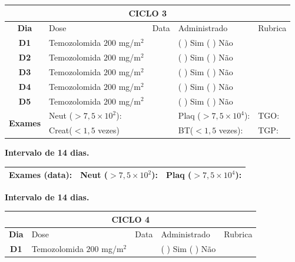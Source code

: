 \documentclass[11pt,a4paper,oldfontcommands]{memoir}
\begin{document}
\begin{center}
\begin{table}[H]
\begin{tabular}{p{1cm}p{5cm}|p{1cm}|p{4.5cm}|p{2cm}}
	\hline
	\multicolumn{5}{c}{\textbf{CICLO 3}}\\
\hline
    \multicolumn{1}{c|}{\multirow{1}{*}{\textbf{Dia}}}&{Dose}&{Data}&{Administrado}&{Rubrica} \\
    \hline
    \multicolumn{1}{c|}{\multirow{1}{*}{\textbf{D1}}}&{Temozolomida \(200\) mg/m\(^2\)}&&{(  ) Sim (  ) Não}&\\
    \multicolumn{1}{c|}{\multirow{1}{*}{\textbf{D2}}}&{Temozolomida \(200\) mg/m\(^2\)}&&{(  ) Sim (  ) Não}&\\
    \multicolumn{1}{c|}{\multirow{1}{*}{\textbf{D3}}}&{Temozolomida \(200\) mg/m\(^2\)}&&{(  ) Sim (  ) Não}&\\
    \multicolumn{1}{c|}{\multirow{1}{*}{\textbf{D4}}}&{Temozolomida \(200\) mg/m\(^2\)}&&{(  ) Sim (  ) Não}&\\
    \multicolumn{1}{c|}{\multirow{1}{*}{\textbf{D5}}}&{Temozolomida \(200\) mg/m\(^2\)}&&{(  ) Sim (  ) Não}&\\
    \hline
    \multicolumn{1}{c|}{\multirow{2}{*}{\textbf{Exames}}}&\multicolumn{2}{l|}{Neut (\(>7,5\times10^2\)):}&{Plaq (\(>7,5\times10^4\)):}&{TGO:}\\
    \cline{2-5}
    \multicolumn{1}{c|}{\multirow{2}{*}{{}}}&\multicolumn{2}{l|}{Creat(\(<1,5\) vezes)}&{BT(\(<1,5\) vezes):}&{TGP:}
    \\
    \hline
\end{tabular}
\end{table}
\textbf{Intervalo de 14 dias.}
\begin{table}[H]
\begin{tabular}{p{5cm}|p{5cm}|p{4.7cm}}
    \hline
    \textbf{Exames (data):}&{Neut (\(>7,5\times10^2\)):}&{Plaq (\(>7,5\times10^4\)):}
    \\
    \hline
\end{tabular}
\end{table}
\textbf{Intervalo de 14 dias.}
\begin{table}[H]
\begin{tabular}{p{1cm}p{5cm}|p{1cm}|p{4.5cm}|p{2cm}}
	\hline
	\multicolumn{5}{c}{\textbf{CICLO 4}}\\
\hline
    \multicolumn{1}{c|}{\multirow{1}{*}{\textbf{Dia}}}&{Dose}&{Data}&{Administrado}&{Rubrica} \\
    \hline
    \multicolumn{1}{c|}{\multirow{1}{*}{\textbf{D1}}}&{Temozolomida \(200\) mg/m\(^2\)}&&{(  ) Sim (  ) Não}&\\

\end{tabular}
\end{table}
\end{center}
\end{document}
